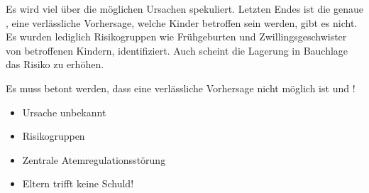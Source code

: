 {%
Es wird viel über die möglichen Ursachen spekuliert.  Letzten Endes ist
die genaue , eine verlässliche
Vorhersage, welche Kinder betroffen sein werden, gibt es
nicht. Es wurden lediglich Risikogruppen wie Frühgeburten
und Zwillingsgeschwister von betroffenen Kindern,
identifiziert. Auch scheint die Lagerung in Bauchlage das
Risiko zu erhöhen.

Es muss betont werden, dass eine verlässliche Vorhersage
nicht möglich ist und !

}{
\begin{itemize}
    \item Ursache unbekannt
    \item Risikogruppen
    \item Zentrale Atemregulationsstörung 
    \item Eltern trifft keine Schuld!
\end{itemize}
}{}{}{}


% 
% 	
% 

